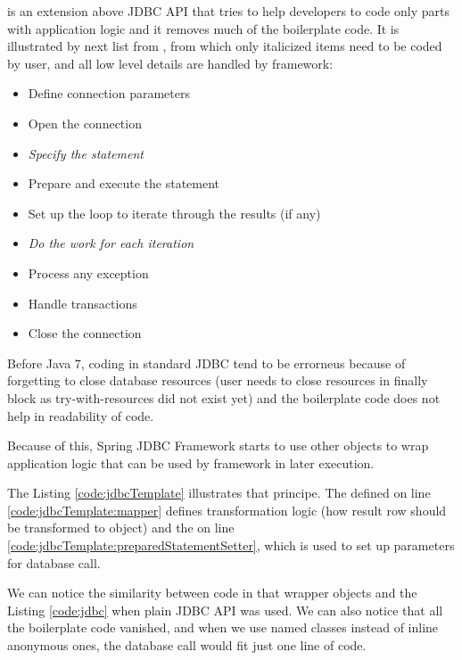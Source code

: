 \citet{SpringJDBC} is an extension above JDBC API that tries to help developers to code only
parts with application logic and it removes much of the boilerplate code.
It is illustrated by next list from \citet{SpringJDBC}, from which only
italicized items need to be coded by user, and all low level details
are handled by framework:
\begin{itemize}
  \item Define connection parameters
  \item Open the connection
  \item \textit{Specify the statement}
  \item Prepare and execute the statement
  \item Set up the loop to iterate through the results (if any)
  \item \textit{Do the work for each iteration}
  \item Process any exception
  \item Handle transactions
  \item Close the connection   
\end{itemize}

Before Java 7, coding in standard JDBC tend to be errorneus because of forgetting to close
database resources (user needs to close resources in finally block as try-with-resources did not exist yet)
and the boilerplate code does not help in readability of code.

Because of this, Spring JDBC Framework starts to use other objects
to wrap application logic that can be used by framework in later execution.

The Listing \ref{code:jdbcTemplate} illustrates that principe.
The  defined on line \ref{code:jdbcTemplate:mapper} defines transformation
logic (how result row should be transformed to  object)
and the  on line \ref{code:jdbcTemplate:preparedStatementSetter},
which is used to set up parameters for database call.

We can notice the similarity between code in that wrapper objects and the Listing
\ref{code:jdbc} when plain JDBC API was used. We can also notice that all the boilerplate code vanished,
and when we use named classes instead of inline anonymous ones, the database call would fit just one line of code.







